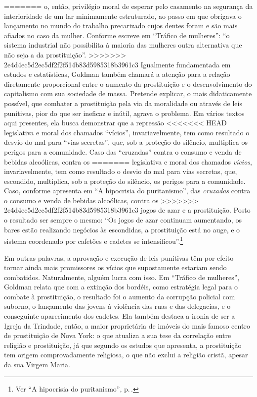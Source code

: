 =======
o, então, privilégio moral de esperar pelo casamento na segurança da
interioridade de um lar minimamente estruturado, ao passo em que
obrigava o lançamento no mundo do trabalho precarizado cujos dentes
foram e são mais afiados no caso da mulher. Conforme escreve em
``Tráfico de mulheres'': ``o sistema industrial não possibilita à
maioria das mulheres outra alternativa que não seja a da prostituição''.
>>>>>>> 2e4d4ec5d2ec5df2f2f514b83d5985318b3961c3
Igualmente fundamentada em estudos e estatísticas, Goldman também
chamará a atenção para a relação diretamente proporcional entre o
aumento da prostituição e o desenvolvimento do capitalismo com sua
sociedade de massa. Pretende explicar, o mais didaticamente
possível, que combater a prostituição pela via da moralidade ou através
de leis punitivas, pior do que ser ineficaz e inútil, agrava o problema.
Em vários textos aqui presentes, ela busca demonstrar que a repressão
<<<<<<< HEAD
legislativa e moral dos chamados ``vícios'', invariavelmente, tem como
resultado o desvio do mal para ``vias secretas'', que, sob a proteção do silêncio,
multiplica os perigos para a comunidade.
Caso das
``cruzadas'' contra o consumo e venda de bebidas alcoólicas, contra os
=======
legislativa e moral dos chamados \textit{vícios}, invariavelmente, tem como
resultado o desvio do mal para vias secretas, que, escondido,
multiplica, sob a proteção do silêncio, os perigos para a comunidade.
Caso, conforme apresenta em ``A hipocrisia do puritanismo'', das
\textit{cruzadas} contra o consumo e venda de bebidas alcoólicas, contra os
>>>>>>> 2e4d4ec5d2ec5df2f2f514b83d5985318b3961c3
jogos de azar e a prostituição. Posto o resultado ser sempre o mesmo:
``Os jogos de azar continuam aumentando, os bares estão realizando
negócios às escondidas, a prostituição está no auge, e o sistema
coordenado por cafetões e cadetes se intensificou''.\footnote{Ver ``A hipocrisia do puritanismo'', p.\,\pageref{hipocrisia}.}

Em outras palavras,
a aprovação e execução de leis punitivas têm por efeito tornar ainda
mais promissores os vícios que supostamente estariam sendo combatidos.
Naturalmente, alguém lucra com isso. Em ``Tráfico de mulheres'', Goldman
relata que com a extinção dos bordéis, como estratégia legal para o
combate à prostituição, o resultado foi o aumento da corrupção policial
com suborno, o lançamento das jovens à violência das ruas e das
delegacias, e o conseguinte aparecimento dos cadetes. Ela também
destaca a ironia de ser a Igreja da Trindade, então, a maior
proprietária de imóveis do mais famoso centro de prostituição de Nova
York: o que atualiza a sua tese da correlação entre religião e
prostituição, já que segundo os estudos que apresenta, a prostituição
tem origem comprovadamente religiosa, o que não exclui a religião
cristã, apesar da sua Virgem Maria. 

